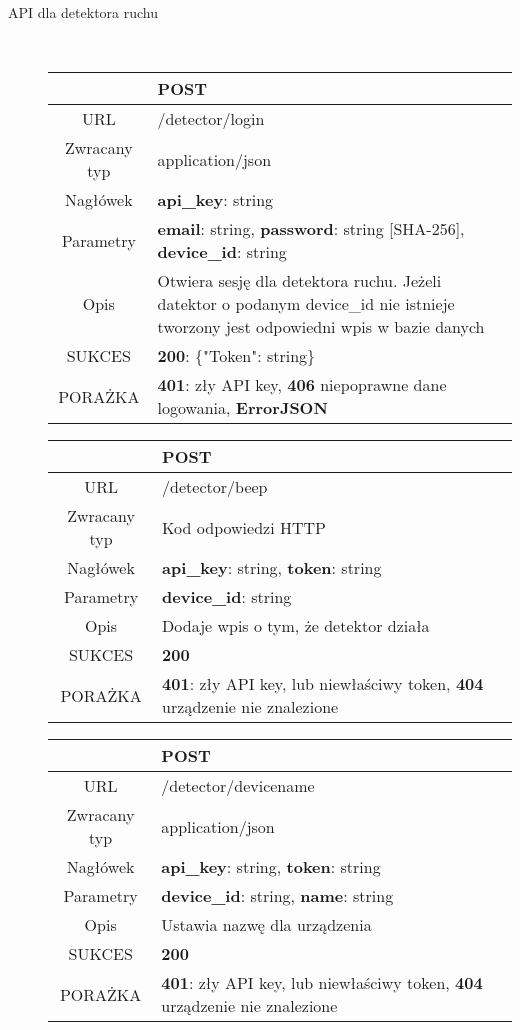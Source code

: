 \begin{description}
		\item[API dla detektora ruchu] \hfill \\
		
		\begin{tabularx}{\linewidth} {|c|X|}
		\hline
						& {\bf POST}\\ \hline
		  URL 			& /detector/login\\
		  Zwracany typ 	& application/json\\
		  Nagłówek 		& {\bf api\_key}: string\\
		  Parametry 	& {\bf email}: string, {\bf password}: string [SHA-256], {\bf device\_id}: string\\
		  Opis 			& Otwiera sesję dla detektora ruchu. Jeżeli datektor o podanym device\_id nie istnieje tworzony jest odpowiedni wpis w bazie danych \\
		  SUKCES 		& {\bf 200}: \{"Token": string\}\\
		  PORAŻKA 		& {\bf 401}: zły API key, {\bf 406} niepoprawne dane logowania, {\bf ErrorJSON}\\
		  \hline
		\end{tabularx}
		
		\begin{tabularx}{\linewidth} {|c|X|}
		\hline
						& {\bf POST}\\ \hline
		  URL 			& /detector/beep\\
		  Zwracany typ 	& Kod odpowiedzi HTTP\\
		  Nagłówek 		& {\bf api\_key}: string, {\bf token}: string\\
		  Parametry 	& {\bf device\_id}: string\\
		  Opis 			& Dodaje wpis o tym, że detektor działa\\
		  SUKCES 		& {\bf 200}\\
		  PORAŻKA 		& {\bf 401}: zły API key, lub niewłaściwy token, {\bf 404} urządzenie nie znalezione\\
		  \hline
		\end{tabularx}
		
		\begin{tabularx}{\linewidth} {|c|X|}
		\hline
						& {\bf POST}\\ \hline
		  URL 			& /detector/devicename\\
		  Zwracany typ 	& application/json\\
		  Nagłówek 		& {\bf api\_key}: string, {\bf token}: string\\
		  Parametry 	& {\bf device\_id}: string, {\bf name}: string\\
		  Opis 			& Ustawia nazwę dla urządzenia\\
		  SUKCES 		& {\bf 200}\\
		  PORAŻKA 		& {\bf 401}: zły API key, lub niewłaściwy token, {\bf 404} urządzenie nie znalezione\\
		  \hline
		\end{tabularx}
		

\end{description}
